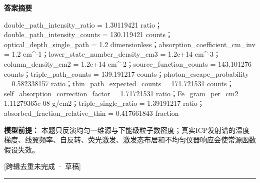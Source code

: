\documentclass[UTF8,11pt,a4paper]{ctexart}
\begin{document}
\noindent\textbf{答案摘要}\par
double\_path\_intensity\_ratio = 1.30119421 ratio；double\_path\_intensity\_counts = 130.119421 counts；optical\_depth\_single\_path = 1.2 dimensionless；absorption\_coefficient\_cm\_inv = 1.2 cm\textasciicircum{}-1；lower\_state\_number\_density\_cm3 = 1.2e+14 cm\textasciicircum{}-3；column\_density\_cm2 = 1.2e+14 cm\textasciicircum{}-2；source\_function\_counts = 143.101276 counts；triple\_path\_counts = 139.191217 counts；photon\_escape\_probability = 0.582338157 ratio；thin\_path\_expected\_counts = 171.721531 counts；self\_absorption\_correction\_factor = 1.71721531 ratio；Fe\_gram\_per\_cm2 = 1.11279365e-08 g/cm2；triple\_single\_ratio = 1.39191217 ratio；absorbed\_fraction\_relative\_thin = 0.417661843 fraction\par
\noindent\textbf{模型前提：}
本题只反演均匀一维源与下能级粒子数密度；真实ICP发射谱的温度梯度、线翼频率、自反转、荧光激发、激发态布居和不均匀仪器响应会使常源函数假设失效。\par
\noindent\textcolor{red!65!black}{[跨辑去重未完成 · 草稿]} \par
\medskip\hrule\medskip
{}
\end{document}
